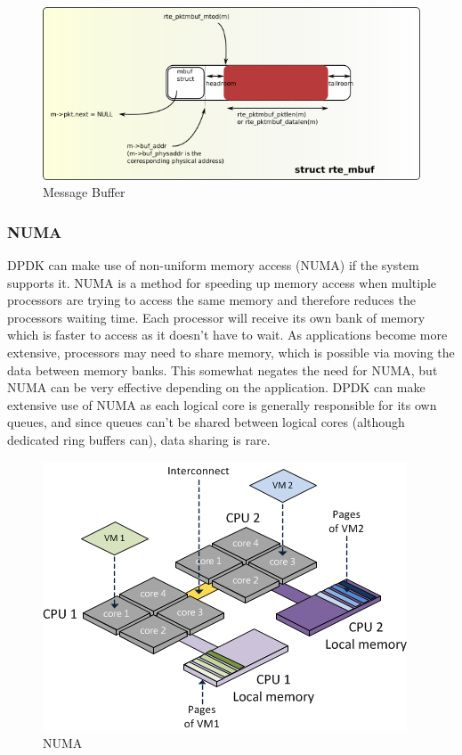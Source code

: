 \documentclass[final_report.tex]{subfiles}
\begin{document}
\begin{figure}[H]
	\centering
	\includegraphics[width=\textwidth]{img/mbuf.png}
	\caption{Message Buffer}
	\label{fig:mbuf}
\end{figure}

\subsubsection{NUMA}
\label{subsec:numa}
DPDK can make use of non-uniform memory access (NUMA) if the system supports it. NUMA is a method for speeding up memory access when multiple processors are trying to access the same memory and therefore reduces the processors waiting time. Each processor will receive its own bank of memory which is faster to access as it doesn't have to wait. As applications become more extensive, processors may need to share memory, which is possible via moving the data between memory banks. This somewhat negates the need for NUMA, but NUMA can be very effective depending on the application. DPDK can make extensive use of NUMA as each logical core is generally responsible for its own queues, and since queues can't be shared between logical cores (although dedicated ring buffers can), data sharing is rare.

\begin{figure}[H]
	\centering
	\includegraphics[width=\textwidth/2]{img/numa.png}
	\caption{NUMA}
	\label{fig:numa}
\end{figure}
\end{document}
